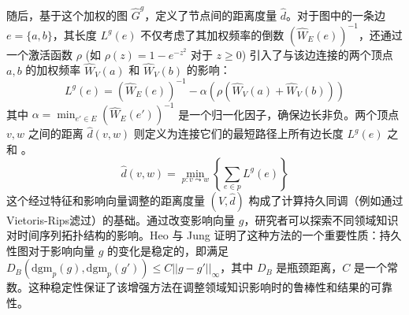 随后，基于这个加权的图 $\hat{G}^g$，定义了节点间的距离度量 $\hat{d}$。对于图中的一条边 $e=\{a,b\}$，其长度 $L^g(e)$ 不仅考虑了其加权频率的倒数 $(\hat{W}_E(e))^{-1}$，还通过一个激活函数 $\rho$ (如 $\rho(z)=1-e^{-z^2}$ 对于 $z \ge 0$) 引入了与该边连接的两个顶点 $a,b$ 的加权频率 $\hat{W}_V(a)$ 和 $\hat{W}_V(b)$ 的影响：
\begin{equation}
    \label{eq:featured_edge_length_revised}
    L^g(e) = (\hat{W}_E(e))^{-1} - \alpha (\rho(\hat{W}_V(a) + \hat{W}_V(b)))
\end{equation}
其中 $\alpha = \min_{e' \in E} (\hat{W}_E(e'))^{-1}$ 是一个归一化因子，确保边长非负。两个顶点 $v,w$ 之间的距离 $\hat{d}(v,w)$ 则定义为连接它们的最短路径上所有边长度 $L^g(e)$ 之和 。
\begin{equation}
    \label{eq:featured_distance_revised}
    \hat{d}(v,w) = \min_{p: v \leadsto w} \left\{ \sum_{e \in p} L^g(e) \right\}
\end{equation}
这个经过特征和影响向量调整的距离度量 $(V, \hat{d})$ 构成了计算持久同调（例如通过Vietoris-Rips滤过）的基础。通过改变影响向量 $g$，研究者可以探索不同领域知识对时间序列拓扑结构的影响。Heo 与 Jung 证明了这种方法的一个重要性质：持久性图对于影响向量 $g$ 的变化是稳定的，即满足 $D_B(\text{dgm}_p(g), \text{dgm}_p(g')) \le C ||g-g'||_\infty$，其中 $D_B$ 是瓶颈距离，$C$ 是一个常数。这种稳定性保证了该增强方法在调整领域知识影响时的鲁棒性和结果的可靠性。
